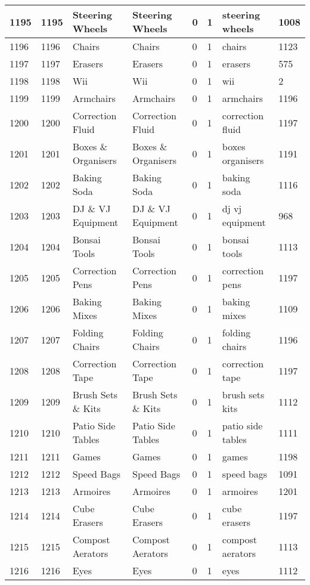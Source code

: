 \begin{longtable}{|l|l|l|l|l|l|l|l|}
1195 & 1195 & Steering Wheels & Steering Wheels & 0 & 1 & steering wheels & 1008 \\ \hline 
1196 & 1196 & Chairs & Chairs & 0 & 1 & chairs & 1123 \\ \hline 
1197 & 1197 & Erasers & Erasers & 0 & 1 & erasers & 575 \\ \hline 
1198 & 1198 & Wii & Wii & 0 & 1 & wii & 2 \\ \hline 
1199 & 1199 & Armchairs & Armchairs & 0 & 1 & armchairs & 1196 \\ \hline 
1200 & 1200 & Correction Fluid & Correction Fluid & 0 & 1 & correction fluid & 1197 \\ \hline 
1201 & 1201 & Boxes \& Organisers & Boxes \& Organisers & 0 & 1 & boxes organisers & 1191 \\ \hline 
1202 & 1202 & Baking Soda & Baking Soda & 0 & 1 & baking soda & 1116 \\ \hline 
1203 & 1203 & DJ \& VJ Equipment & DJ \& VJ Equipment & 0 & 1 & dj vj equipment & 968 \\ \hline 
1204 & 1204 & Bonsai Tools & Bonsai Tools & 0 & 1 & bonsai tools & 1113 \\ \hline 
1205 & 1205 & Correction Pens & Correction Pens & 0 & 1 & correction pens & 1197 \\ \hline 
1206 & 1206 & Baking Mixes & Baking Mixes & 0 & 1 & baking mixes & 1109 \\ \hline 
1207 & 1207 & Folding Chairs & Folding Chairs & 0 & 1 & folding chairs & 1196 \\ \hline 
1208 & 1208 & Correction Tape & Correction Tape & 0 & 1 & correction tape & 1197 \\ \hline 
1209 & 1209 & Brush Sets \& Kits & Brush Sets \& Kits & 0 & 1 & brush sets kits & 1112 \\ \hline 
1210 & 1210 & Patio Side Tables & Patio Side Tables & 0 & 1 & patio side tables & 1111 \\ \hline 
1211 & 1211 & Games & Games & 0 & 1 & games & 1198 \\ \hline 
1212 & 1212 & Speed Bags & Speed Bags & 0 & 1 & speed bags & 1091 \\ \hline 
1213 & 1213 & Armoires & Armoires & 0 & 1 & armoires & 1201 \\ \hline 
1214 & 1214 & Cube Erasers & Cube Erasers & 0 & 1 & cube erasers & 1197 \\ \hline 
1215 & 1215 & Compost Aerators & Compost Aerators & 0 & 1 & compost aerators & 1113 \\ \hline 
1216 & 1216 & Eyes & Eyes & 0 & 1 & eyes & 1112 \\ \hline 

\end{longtable}
